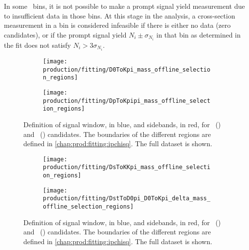 In some \pTy\ bins, it is not possible to make a prompt signal yield 
measurement due to insufficient data in those bins.
At this stage in the analysis, a cross-section measurement in a bin is 
considered infeasible if there is either no data (zero candidates), or if the 
prompt signal yield $N_{i} \pm \sigma_{N_{i}}$ in that bin as determined in the 
fit does not satisfy $N_{i} > 3\sigma_{N_{i}}$.

\begin{figure}
  \begin{subfigure}{0.5\textwidth}
    \texttt{[image: production/fitting/D0ToKpi\_mass\_offline\_selection\_regions]}
    \caption{\DzToKpi}
    \label{fig:prod:fitting:regions:D0ToKpi}
  \end{subfigure}
  \begin{subfigure}{0.5\textwidth}
    \texttt{[image: production/fitting/DpToKpipi\_mass\_offline\_selection\_regions]}
    \caption{\DpToKpipi}
    \label{fig:prod:fitting:regions:DpToKpipi}
  \end{subfigure}
  \caption{%
    Definition of signal window, in blue, and sidebands, in red, for 
    \DzToKpi~() and 
    \DpToKpipi~() candidates.
    The boundaries of the different regions are defined in 
    \cref{chap:prod:fitting:ipchisq}.
    The full dataset is shown.
  }
  \label{fig:prod:fitting:regions_A}
\end{figure}

\begin{figure}
  \begin{subfigure}{0.5\textwidth}
    \texttt{[image: production/fitting/DsToKKpi\_mass\_offline\_selection\_regions]}
    \caption{\DspTophipi}
    \label{fig:prod:fitting:regions:DsTophipi}
  \end{subfigure}
  \begin{subfigure}{0.5\textwidth}
    \texttt{[image: production/fitting/DstToD0pi\_D0ToKpi\_delta\_mass\_offline\_selection\_regions]}
    \caption{\DstToDzpi}
    \label{fig:prod:fitting:regions:DstToD0pi_D0ToKpi}
  \end{subfigure}
  \caption{%
    Definition of signal window, in blue, and sidebands, in red, for 
    \DspTophipi~() and 
    \DstToDzpi~() 
    candidates.
    The boundaries of the different regions are defined in 
    \cref{chap:prod:fitting:ipchisq}.
    The full dataset is shown.
  }
  \label{fig:prod:fitting:regions_B}
\end{figure}

